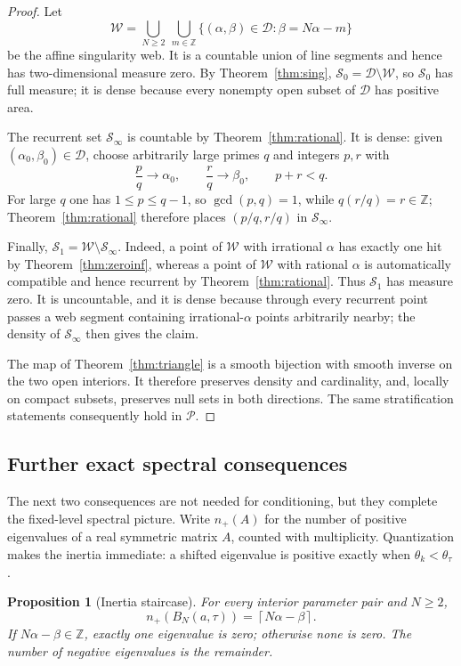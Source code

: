 \documentclass[11pt,reqno]{amsart}
\theoremstyle{plain}
\newtheorem{proposition}[theorem]{Proposition}
\theoremstyle{definition}
\newcommand{\BN}{B_N}
\newcommand{\Z}{\mathbb{Z}}
\begin{document}
\begin{proof}
Let
\[
\mathcal W=\bigcup_{N\ge2}\ \bigcup_{m\in\Z}
\bigl\{(\alpha,\beta)\in\mathcal D:\beta=N\alpha-m\bigr\}
\]
be the affine singularity web.  It is a countable union of line segments and hence
has two-dimensional measure zero.  By Theorem~\ref{thm:sing},
$\mathcal S_0=\mathcal D\setminus\mathcal W$, so $\mathcal S_0$ has full measure;
it is dense because every nonempty open subset of $\mathcal D$ has positive area.

The recurrent set $\mathcal S_\infty$ is countable by Theorem~\ref{thm:rational}.
It is dense: given $(\alpha_0,\beta_0)\in\mathcal D$, choose arbitrarily large
primes $q$ and integers $p,r$ with
\[
\frac pq\to\alpha_0,
\qquad
\frac rq\to\beta_0,
\qquad
p+r<q.
\]
For large $q$ one has $1\le p\le q-1$, so $\gcd(p,q)=1$, while
$q(r/q)=r\in\Z$; Theorem~\ref{thm:rational} therefore places
$(p/q,r/q)$ in $\mathcal S_\infty$.

Finally, $\mathcal S_1=\mathcal W\setminus\mathcal S_\infty$.  Indeed, a point of
$\mathcal W$ with irrational $\alpha$ has exactly one hit by
Theorem~\ref{thm:zeroinf}, whereas a point of $\mathcal W$ with rational $\alpha$
is automatically compatible and hence recurrent by Theorem~\ref{thm:rational}.
Thus $\mathcal S_1$ has measure zero.  It is uncountable, and it is dense because
through every recurrent point passes a web segment containing irrational-$\alpha$
points arbitrarily nearby; the density of $\mathcal S_\infty$ then gives the claim.

The map of Theorem~\ref{thm:triangle} is a smooth bijection with smooth inverse on
the two open interiors.  It therefore preserves density and cardinality, and,
locally on compact subsets, preserves null sets in both directions.  The same
stratification statements consequently hold in $\mathcal P$.
\end{proof}


\subsection*{Further exact spectral consequences}

The next two consequences are not needed for conditioning, but they complete the
fixed-level spectral picture.  Write $n_+(A)$ for the number of positive eigenvalues
of a real symmetric matrix $A$, counted with multiplicity.  Quantization makes the
inertia immediate: a shifted eigenvalue is positive exactly when
$\theta_k<\theta_\tau$.

\begin{proposition}[Inertia staircase]\label{prop:inertia}
For every interior parameter pair and $N\ge2$,
\begin{equation}\label{eq:inertia}
\boxed{
n_+(\BN(a,\tau))=\left\lceil N\alpha-\beta\right\rceil.}
\end{equation}
If $N\alpha-\beta\in\Z$, exactly one eigenvalue is zero; otherwise none is zero.
The number of negative eigenvalues is the remainder.
\end{proposition}
\end{document}
